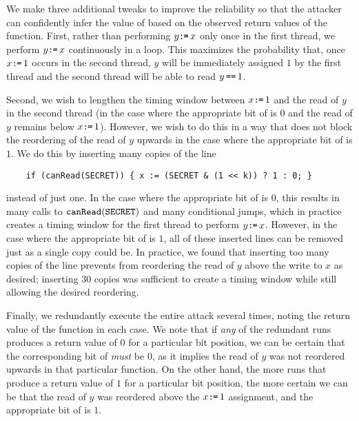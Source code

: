 We make three additional tweaks to improve the reliability so that the attacker
can confidently infer the value of {\SEC} based on the observed return
values of the function.
First, rather than performing $y\texttt{:}\mkern-1mu\texttt{=}\, x$ only once in the first thread, we
perform $y\texttt{:}\mkern-1mu\texttt{=}\, x$ continuously in a loop.
This maximizes the probability that, once $x\texttt{:}\mkern-1mu\texttt{=}\, 1$ occurs in the second
thread, $y$ will be immediately assigned $1$ by the first thread
and the second thread will be able to read $y\,\texttt{==}\, 1$.

Second, we wish to lengthen the timing window between $x\texttt{:}\mkern-1mu\texttt{=}\, 1$ and the
read of $y$ in the second thread (in the case where the appropriate bit of
{\SEC} is $0$ and the read of $y$ remains below $x\texttt{:}\mkern-1mu\texttt{=}\, 1$).
However, we wish to do this in a way that does not block the reordering of the
read of $y$ upwards in the case where the appropriate bit of {\SEC}
is $1$.
We do this by inserting many copies of the line
\begin{verbatim}
    if (canRead(SECRET)) { x := (SECRET & (1 << k)) ? 1 : 0; }
\end{verbatim}
instead of just one.
In the case where the appropriate bit of {\SEC} is $0$, this
results in many calls to $\texttt{canRead}(\texttt{SECRET})$ and many conditional jumps,
which in practice creates a timing window for the first thread to perform
$y\texttt{:}\mkern-1mu\texttt{=}\, x$.
However, in the case where the appropriate bit of {\SEC} is $1$,
all of these inserted lines can be removed just as a single copy could be.
In practice, we found that inserting too many copies of the line prevents
{\GCC} from reordering the read of $y$ above the write to $x$ as
desired; inserting $30$ copies was sufficient to create a timing window
while still allowing the desired reordering.

Finally, we redundantly execute the entire attack several times, noting the
return value of the function in each case.
We note that if \emph{any} of the redundant runs produces a return value of
$0$ for a particular bit position, we can be certain that the
corresponding bit of {\SEC} \emph{must} be $0$, as it implies the
read of $y$ was not reordered upwards in that particular function.
On the other hand, the more runs that produce a return value of $1$ for a
particular bit position, the more certain we can be that the read of $y$
was reordered above the $x\texttt{:}\mkern-1mu\texttt{=}\, 1$ assignment, and the appropriate bit of
{\SEC} is $1$.

